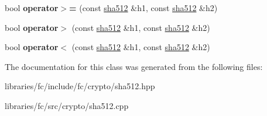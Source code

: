 \begin{DoxyCompactItemize}
bool {\bfseries operator$>$=} (const \mbox{\hyperlink{classfc_1_1sha512}{sha512}} \&h1, const \mbox{\hyperlink{classfc_1_1sha512}{sha512}} \&h2)
\item 
\mbox{\label{classfc_1_1sha512_adc02e323d02228115f0d428e0765d09e}} 
bool {\bfseries operator$>$} (const \mbox{\hyperlink{classfc_1_1sha512}{sha512}} \&h1, const \mbox{\hyperlink{classfc_1_1sha512}{sha512}} \&h2)
\item 
\mbox{\label{classfc_1_1sha512_a362bda52c15891f197a1c266eb2a71ee}} 
bool {\bfseries operator$<$} (const \mbox{\hyperlink{classfc_1_1sha512}{sha512}} \&h1, const \mbox{\hyperlink{classfc_1_1sha512}{sha512}} \&h2)
\end{DoxyCompactItemize}


The documentation for this class was generated from the following files\+:\begin{DoxyCompactItemize}
\item 
libraries/fc/include/fc/crypto/sha512.\+hpp\item 
libraries/fc/src/crypto/sha512.\+cpp\end{DoxyCompactItemize}
